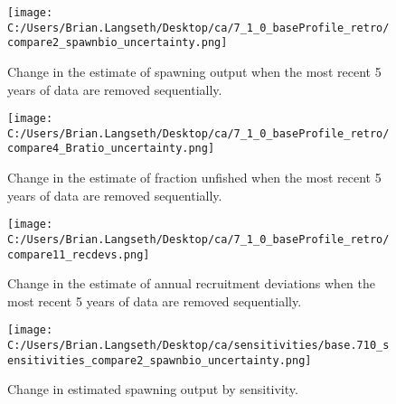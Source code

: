 \documentclass[11pt,
  english,
  a4paper,
]{article}
\begin{document}
\tagmcend\tagstructend


\begin{figure}
\centering
\texttt{[image: C:/Users/Brian.Langseth/Desktop/ca/7\_1\_0\_baseProfile\_retro/compare2\_spawnbio\_uncertainty.png]}
\caption{Change in the estimate of spawning output when the most recent 5 years of data are removed sequentially.\label{fig:retro-ssb}}
\end{figure}

\tagmcend\tagstructend


\begin{figure}
\centering
\texttt{[image: C:/Users/Brian.Langseth/Desktop/ca/7\_1\_0\_baseProfile\_retro/compare4\_Bratio\_uncertainty.png]}
\caption{Change in the estimate of fraction unfished when the most recent 5 years of data are removed sequentially.\label{fig:retro-depl}}
\end{figure}

\tagmcend\tagstructend


\begin{figure}
\centering
\texttt{[image: C:/Users/Brian.Langseth/Desktop/ca/7\_1\_0\_baseProfile\_retro/compare11\_recdevs.png]}
\caption{Change in the estimate of annual recruitment deviations when the most recent 5 years of data are removed sequentially.\label{fig:retro-recdevs}}
\end{figure}

\tagmcend\tagstructend


\begin{figure}
\centering
\texttt{[image: C:/Users/Brian.Langseth/Desktop/ca/sensitivities/base.710\_sensitivities\_compare2\_spawnbio\_uncertainty.png]}
\caption{Change in estimated spawning output by sensitivity.\label{fig:sens-ssb}}
\end{figure}
\end{document}
